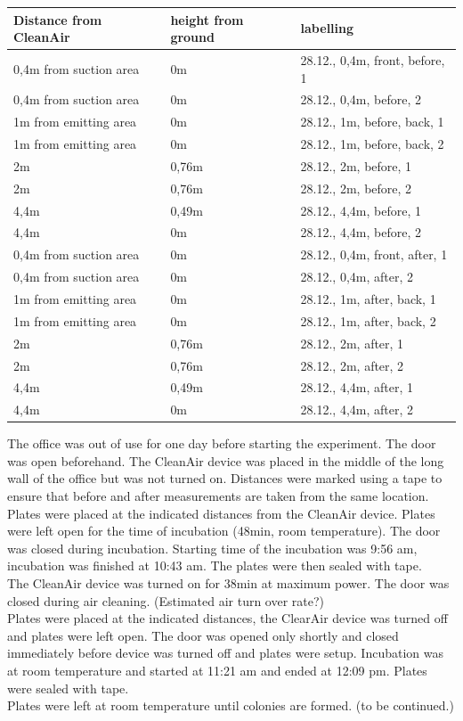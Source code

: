 \documentclass[hyperref]{labbook}
\begin{document}
\begin{table}[h!]
\begin{tabular}{|lll|}\hline
Distance from CleanAir  & height from ground & labelling\\\hline
0,4m from suction area & 0m & 28.12., 0,4m, front, before, 1 \\
0,4m from suction area & 0m & 28.12., 0,4m, before, 2 \\
1m from emitting area & 0m & 28.12., 1m, before, back, 1\\
1m from emitting area & 0m & 28.12., 1m, before, back, 2\\
2m & 0,76m & 28.12., 2m, before, 1\\
2m & 0,76m & 28.12., 2m, before, 2\\
4,4m & 0,49m & 28.12., 4,4m, before, 1\\
4,4m & 0m & 28.12., 4,4m, before, 2\\\hline
0,4m from suction area & 0m & 28.12., 0,4m, front, after, 1 \\
0,4m from suction area & 0m & 28.12., 0,4m, after, 2 \\
1m from emitting area & 0m & 28.12., 1m, after, back, 1\\
1m from emitting area & 0m & 28.12., 1m, after, back, 2\\
2m & 0,76m & 28.12., 2m, after, 1\\
2m & 0,76m & 28.12., 2m, after, 2\\
4,4m & 0,49m & 28.12., 4,4m, after, 1\\
4,4m & 0m & 28.12., 4,4m, after, 2\\\hline
\end{tabular}
\end{table}

The office was out of use for one day before starting the experiment. The door was open beforehand. The CleanAir device was placed in the middle of the long wall of the office but was not turned on. Distances were marked using a tape to ensure that before and after measurements are taken from the same location. Plates were placed at the indicated distances from the CleanAir device. Plates were left open for the time of incubation (48min, room temperature). The door was closed during incubation. Starting time of the incubation was 9:56 am, incubation was finished at 10:43 am. The plates were then sealed with tape.\\
The CleanAir device was turned on for 38min at maximum power. The door was closed during air cleaning. (Estimated air turn over rate?)\\
Plates were placed at the indicated distances, the ClearAir device was turned off and plates were left open. The door was opened only shortly and closed immediately before device was turned off and plates were setup. Incubation was at room temperature and started at 11:21 am and ended at 12:09 pm. Plates were sealed with tape.\\
Plates were left at room temperature until colonies are formed. (to be continued.)
\end{document}
